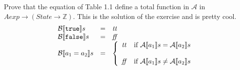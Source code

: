 \documentclass[
10pt, %
a4paper, %
oneside, %
headinclude,footinclude, %
BCOR5mm, %
]{scrartcl}
\begin{document}
\maketitle 
\setcounter{tocdepth}{3} 
\setcounter{secnumdepth}{0}
\tableofcontents 

\newpage 

{Prove that the equation of Table 1.1 define a total function in $\mathcal{A}$ in $Aexp \rightarrow (State \rightarrow \mathbb{Z})$.}
{
 This is the solution of the exercise and is pretty cool.
  $$
  \begin{array}{lll}
  \B{\synTrue} & = & \semTrue \\
  \B{\synFalse} & = & \semFalse \\ 
  \B{a_1 = a_2} & = & \caseFun{\semTrue}{\A{a_1} = \A{a_2}}{\semFalse}{\A{a_1} \neq \A{a_2}}\\
  \end{array}
  $$
}
\end{document}
